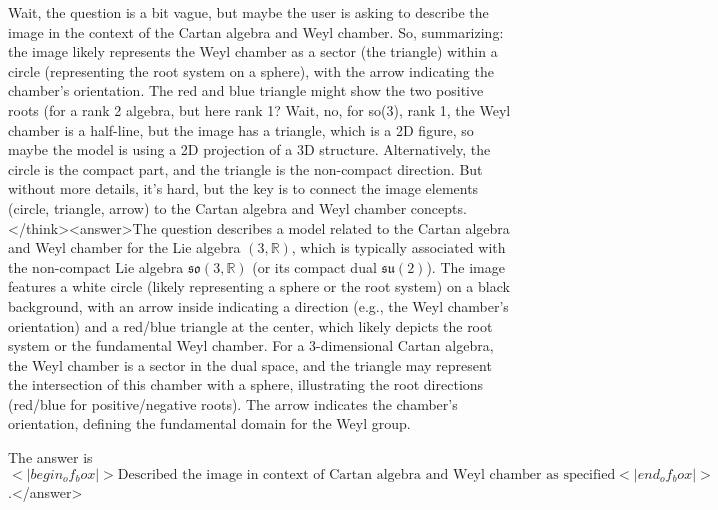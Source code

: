 Wait, the question is a bit vague, but maybe the user is asking to describe the image in the context of the Cartan algebra and Weyl chamber. So, summarizing: the image likely represents the Weyl chamber as a sector (the triangle) within a circle (representing the root system on a sphere), with the arrow indicating the chamber's orientation. The red and blue triangle might show the two positive roots (for a rank 2 algebra, but here rank 1? Wait, no, for so(3), rank 1, the Weyl chamber is a half-line, but the image has a triangle, which is a 2D figure, so maybe the model is using a 2D projection of a 3D structure. Alternatively, the circle is the compact part, and the triangle is the non-compact direction. But without more details, it's hard, but the key is to connect the image elements (circle, triangle, arrow) to the Cartan algebra and Weyl chamber concepts.</think><answer>The question describes a model related to the Cartan algebra and Weyl chamber for the Lie algebra \((3, \mathbb{R})\), which is typically associated with the non-compact Lie algebra \(\mathfrak{so}(3, \mathbb{R})\) (or its compact dual \(\mathfrak{su}(2)\)). The image features a white circle (likely representing a sphere or the root system) on a black background, with an arrow inside indicating a direction (e.g., the Weyl chamber's orientation) and a red/blue triangle at the center, which likely depicts the root system or the fundamental Weyl chamber. For a 3-dimensional Cartan algebra, the Weyl chamber is a sector in the dual space, and the triangle may represent the intersection of this chamber with a sphere, illustrating the root directions (red/blue for positive/negative roots). The arrow indicates the chamber's orientation, defining the fundamental domain for the Weyl group.  

The answer is \(<|begin_of_box|>\text{Described the image in context of Cartan algebra and Weyl chamber as specified}<|end_of_box|>\).</answer>